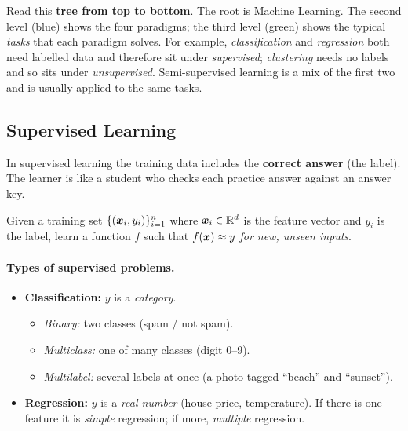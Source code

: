 \begin{explain}
Read this \textbf{tree from top to bottom}. The root is Machine Learning. The second level (blue) shows the four paradigms; the third level (green) shows the typical \emph{tasks} that each paradigm solves. For example, \emph{classification} and \emph{regression} both need labelled data and therefore sit under \emph{supervised}; \emph{clustering} needs no labels and so sits under \emph{unsupervised}. Semi-supervised learning is a mix of the first two and is usually applied to the same tasks.
\end{explain}

\subsection{Supervised Learning}

In supervised learning the training data includes the \textbf{correct answer} (the label). The learner is like a student who checks each practice answer against an answer key.

\begin{definition}
Given a training set $\{(\boldsymbol{x}_i, y_i)\}_{i=1}^{n}$ where $\boldsymbol{x}_i\in\mathbb{R}^d$ is the feature vector and $y_i$ is the label, learn a function $f$ such that $f(\boldsymbol{x})\approx y$ \emph{for new, unseen inputs}.
\end{definition}

\paragraph{Types of supervised problems.}
\begin{itemize}
  \item \textbf{Classification:} $y$ is a \emph{category}.
    \begin{itemize}
      \item \emph{Binary:} two classes (spam / not spam).
      \item \emph{Multiclass:} one of many classes (digit 0--9).
      \item \emph{Multilabel:} several labels at once (a photo tagged ``beach'' and ``sunset'').
    \end{itemize}
  \item \textbf{Regression:} $y$ is a \emph{real number} (house price, temperature). If there is one feature it is \emph{simple} regression; if more, \emph{multiple} regression.
\end{itemize}

